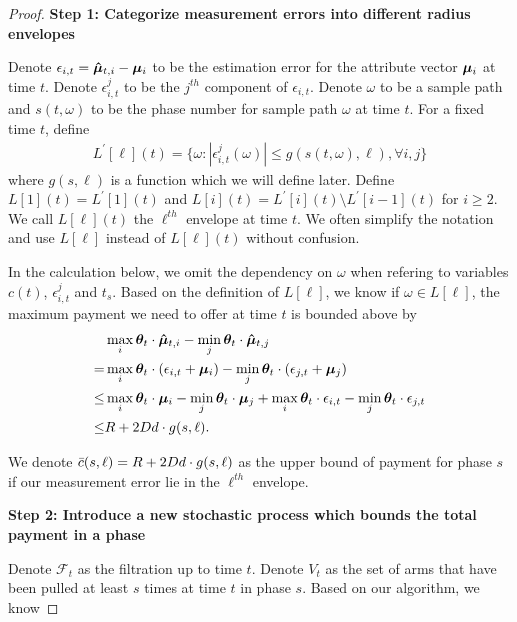 \begin{proof}

\noindent\textbf{Step 1: Categorize measurement errors into different radius envelopes}


Denote $\epsilon_{i,t}=\bm{\hat{\mu}}_{t,i}-\bm{\mu}_{i}$ to be the estimation error for the attribute vector $\bm{\mu}_{i}$ at time $t$. Denote $\epsilon_{i,t}^{j}$ to be the $j^{th}$ component of $\epsilon_{i,t}$. Denote $\omega$ to be a sample path and $s(t,\omega)$ to be the phase number for sample path $\omega$ at time $t$. For a fixed time $t$, define
\begin{align}
L^{'}[\ell](t) = \{\omega:|\epsilon_{i,t}^{j}(\omega)|\leq g(s(t,\omega),\ell), \forall i,j\}\nonumber
\end{align}
where $g(s,\ell)$ is a function which we will define later. Define $L[1](t) = L^{'}[1](t)$ and $L[i](t) = L^{'}[i](t)\setminus L^{'}[i-1](t)$ for $i\geq 2$. We call $L[\ell](t)$ the $\ell^{th}$ envelope at time $t$. We often simplify the notation and use $L[\ell]$ instead of $L[\ell](t)$ without confusion.

In the calculation below, we omit the dependency on $\omega$ when refering to variables $c(t)$, $\epsilon_{i,t}^{j}$ and $t_s$. Based on the definition of $L[\ell]$, we know if $\omega\in L[\ell]$, the maximum payment we need to offer at time $t$ is bounded above by 
\begin{align}
&\max_{i}\bm{\theta}_{t}\cdot \bm{\hat{\mu}}_{t,i} - \min_{j}\bm{\theta}_{t}\cdot \bm{\hat{\mu}}_{t,j} \nonumber \\
= &\max_{i}\bm{\theta}_{t}\cdot (\epsilon_{i,t}+\bm{\mu}_{i}) - \min_{j}\bm{\theta}_{t}\cdot (\epsilon_{j,t}+\bm{\mu}_{j}) \nonumber \\
\leq &\max_{i}\bm{\theta}_{t}\cdot \bm{\mu}_{i} - \min_{j}\bm{\theta}_{t}\cdot \bm{\mu}_{j} +\max_{i}\bm{\theta}_{t}\cdot \epsilon_{i,t} - \min_{j}\bm{\theta}_{t}\cdot \epsilon_{j,t}\nonumber \\
\leq & R + 2D d\cdot g(s,\ell). \nonumber
\end{align}

We denote $\bar{c}(s,\ell)=R + 2D d\cdot g(s,\ell)$ as the upper bound of payment for phase $s$ if our measurement error lie in the $\ell^{th}$ envelope.


\noindent\textbf{Step 2: Introduce a new stochastic process which bounds the total payment in a phase}

Denote $\mathcal{F}_t$ as the filtration up to time $t$. Denote $V_t$ as the set of arms that have been pulled at least $s$ times at time $t$ in phase $s$. Based on our algorithm, we know


\end{proof}
